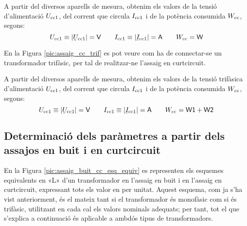 A partir del diversos aparells de mesura, obtenim els valors de la
tensió d'alimentació $U_\mathrm{cc1}$, del corrent que circula
$I_\mathrm{cc1}$ i de la potència consumida $W_\mathrm{cc}$, segons:
\begin{equation}
    U\ped{cc1}\equiv|\cmplx{U}\ped{cc1}|=\textsf{V} \qquad
    I\ped{cc1}\equiv|\cmplx{I}\ped{cc1}|=\textsf{A}
     \qquad W\ped{cc}=\textsf{W}
\end{equation}

En la Figura \vref{pic:assaig_cc_trif} es pot veure com ha de
connectar-se un transformador trifàsic, per tal de realitzar-ne l'assaig en curtcircuit.

\begin{center}
    
    \label{pic:assaig_cc_trif}
\end{center}


A partir del diversos aparells de mesura, obtenim els valors de la
tensió trifàsica d'alimentació $U_\mathrm{cc1}$, del corrent que circula
$I_\mathrm{cc1}$ i de la potència consumida $W_\mathrm{cc}$, segons:
\begin{equation}
    U\ped{cc1}\equiv|\cmplx{U}\ped{cc1}|=\textsf{V} \qquad
    I\ped{cc1}\equiv|\cmplx{I}\ped{cc1}|=\textsf{A} \qquad
    W\ped{cc}=\textsf{W1}+\textsf{W2}
\end{equation}

\subsection{Determinació dels paràmetres a partir dels assajos en buit i en curtcircuit}

En la Figura \vref{pic:assaig_buit_cc_esq_equiv}  es representen els
esquemes equivalents en «L» d'un transformador en l'assaig en buit i
en l'assaig en curtcircuit, expressant tots els valor en per unitat.
Aquest esquema, com ja s'ha vist anteriorment, és el mateix tant si
el transformador és monofàsic com si és trifàsic, utilitzant en cada
cal els valors nominals adequats; per tant, tot el que s'explica  a
continuació és aplicable a ambdós tipus de transformadors.

\begin{center}
    
     \label{pic:assaig_buit_cc_esq_equiv}
\end{center}

